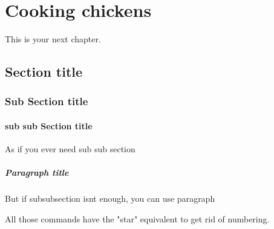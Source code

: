 \ifx\isEmbedded\undefined

\graphicspath{{../img/}}

\fi

\chapter{Cooking chickens}
\label{chap:cooking}

This is your next chapter. 
\section{Section title}
\subsection{Sub Section title}
\subsubsection{sub sub Section title}
As if you ever need sub sub section
\paragraph{Paragraph title}
But if subsubsection isnt enough, you can use paragraph

All those commands have the "star" equivalent to get rid of numbering.

\ifx\isEmbedded\undefined


\pagebreak

\fi
